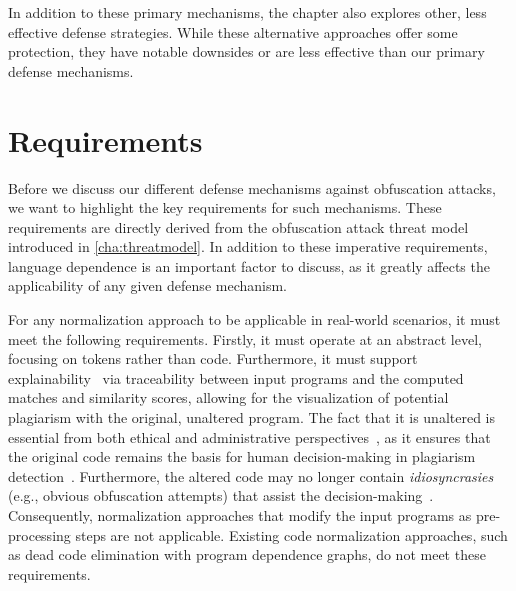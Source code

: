 In addition to these primary mechanisms, the chapter also explores other, less effective defense strategies. While these alternative approaches offer some protection, they have notable downsides or are less effective than our primary defense mechanisms.



\section{Requirements}\label{sec:tsn-requirements}
Before we discuss our different defense mechanisms against obfuscation attacks, we want to highlight the key requirements for such mechanisms.
These requirements are directly derived from the obfuscation attack threat model introduced in \autoref{cha:threatmodel}.
%
In addition to these imperative requirements, language dependence is an important factor to discuss, as it greatly affects the applicability of any given defense mechanism.

For any normalization approach to be applicable in real-world scenarios, it must meet the following requirements.
Firstly, it must operate at an {abstract level}, focusing on tokens rather than code.
Furthermore, it must support {explainability}~\cite{Karnalim2021} via traceability between input programs and the computed matches and similarity scores, allowing for the visualization of potential plagiarism with the original, {unaltered program}.
The fact that it is unaltered is essential from both ethical and administrative perspectives~\cite{Simon2016}, as it ensures that the original code remains the basis for human decision-making in plagiarism detection~\cite{Le2013}.
Furthermore, the altered code may no longer contain \textit{idiosyncrasies} (e.g., obvious obfuscation attempts) that assist the decision-making~\cite{Novak2019}.
Consequently, normalization approaches that modify the input programs as pre-processing steps are not applicable.
Existing code normalization approaches, such as dead code elimination with program dependence graphs, do not meet these requirements.

